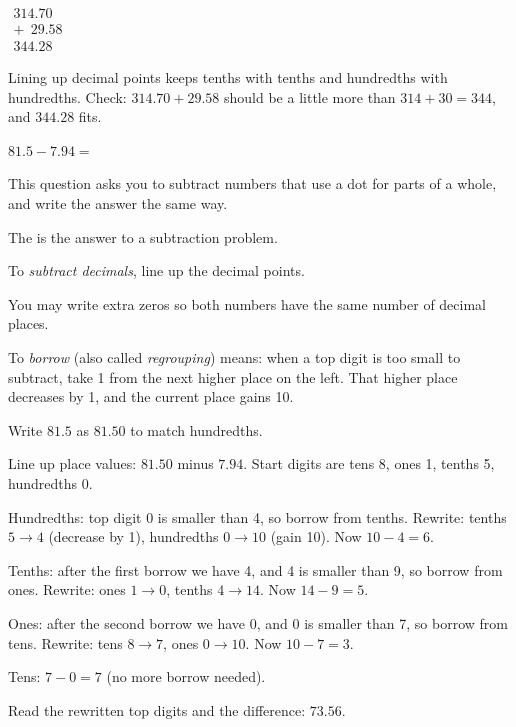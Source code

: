 \begin{center}
$\begin{array}{r}
  314.70\\
  +\;\,29.58\\ \hline
  344.28
\end{array}$
\end{center}


Lining up decimal points keeps tenths with tenths and hundredths with hundredths.
Check: $314.70 + 29.58$ should be a little more than $314 + 30 = 344$, and
$344.28$ fits.


$81.5 - 7.94 = $\ansblank[1.8cm]


This question asks you to subtract numbers that use a dot for parts of a whole,
and write the answer the same way.

\begin{words}
  \item The is the answer to a subtraction problem.
  \item To \textit{subtract decimals}, line up the decimal points.
  \item You may write extra zeros so both numbers have the same number of decimal places.
  \item To \textit{borrow} (also called \textit{regrouping}) means: when a top digit is
        too small to subtract, take 1 from the next higher place on the left. That
        higher place decreases by 1, and the current place gains 10.
\end{words}

\begin{steps}
  \item Write $81.5$ as $81.50$ to match hundredths.
  \item Line up place values: $81.50$ minus $7.94$. Start digits are tens 8, ones 1, tenths 5, hundredths 0.
  \item Hundredths: top digit 0 is smaller than 4, so borrow from tenths. Rewrite:
        tenths $5 \to 4$ (decrease by 1), hundredths $0 \to 10$ (gain 10). Now $10 - 4 = 6$.
  \item Tenths: after the first borrow we have 4, and 4 is smaller than 9, so borrow
        from ones. Rewrite: ones $1 \to 0$, tenths $4 \to 14$. Now $14 - 9 = 5$.
  \item Ones: after the second borrow we have 0, and 0 is smaller than 7, so borrow
        from tens. Rewrite: tens $8 \to 7$, ones $0 \to 10$. Now $10 - 7 = 3$.
  \item Tens: $7 - 0 = 7$ (no more borrow needed).
  \item Read the rewritten top digits and the difference: $73.56$.
\end{steps}

